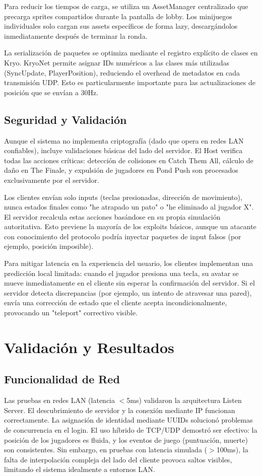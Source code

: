 \documentclass[conference]{IEEEtran}
\begin{document}
Para reducir los tiempos de carga, se utiliza un AssetManager centralizado que precarga sprites compartidos durante la pantalla de lobby. Los minijuegos individuales solo cargan sus assets específicos de forma lazy, descargándolos inmediatamente después de terminar la ronda.

La serialización de paquetes se optimiza mediante el registro explícito de clases en Kryo. KryoNet permite asignar IDs numéricos a las clases más utilizadas (SyncUpdate, PlayerPosition), reduciendo el overhead de metadatos en cada transmisión UDP. Esto es particularmente importante para las actualizaciones de posición que se envían a 30Hz.

\subsection{Seguridad y Validación}

Aunque el sistema no implementa criptografía (dado que opera en redes LAN confiables), incluye validaciones básicas del lado del servidor. El Host verifica todas las acciones críticas: detección de colisiones en Catch Them All, cálculo de daño en The Finale, y expulsión de jugadores en Pond Push son procesados exclusivamente por el servidor.

Los clientes envían solo inputs (teclas presionadas, dirección de movimiento), nunca estados finales como "he atrapado un pato" o "he eliminado al jugador X". El servidor recalcula estas acciones basándose en su propia simulación autoritativa. Esto previene la mayoría de los exploits básicos, aunque un atacante con conocimiento del protocolo podría inyectar paquetes de input falsos (por ejemplo, posición imposible).

Para mitigar latencia en la experiencia del usuario, los clientes implementan una predicción local limitada: cuando el jugador presiona una tecla, su avatar se mueve inmediatamente en el cliente sin esperar la confirmación del servidor. Si el servidor detecta discrepancias (por ejemplo, un intento de atravesar una pared), envía una corrección de estado que el cliente acepta incondicionalmente, provocando un "teleport" correctivo visible.

\section{Validación y Resultados}

\subsection{Funcionalidad de Red}
Las pruebas en redes LAN (latencia $<$5ms) validaron la arquitectura Listen Server. El descubrimiento de servidor y la conexión mediante IP funcionan correctamente. La asignación de identidad mediante UUIDs solucionó problemas de concurrencia en el login. El uso híbrido de TCP/UDP demostró ser efectivo: la posición de los jugadores es fluida, y los eventos de juego (puntuación, muerte) son consistentes. Sin embargo, en pruebas con latencia simulada ($>$100ms), la falta de interpolación compleja del lado del cliente provoca saltos visibles, limitando el sistema idealmente a entornos LAN.
\end{document}
